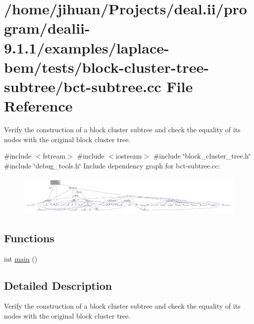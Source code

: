 \hypertarget{bct-subtree_8cc}{}\section{/home/jihuan/\+Projects/deal.ii/program/dealii-\/9.1.1/examples/laplace-\/bem/tests/block-\/cluster-\/tree-\/subtree/bct-\/subtree.cc File Reference}
\label{bct-subtree_8cc}


Verify the construction of a block cluster subtree and check the equality of its nodes with the original block cluster tree.  


{\ttfamily \#include $<$fstream$>$}\newline
{\ttfamily \#include $<$iostream$>$}\newline
{\ttfamily \#include \char`\"{}block\+\_\+cluster\+\_\+tree.\+h\char`\"{}}\newline
{\ttfamily \#include \char`\"{}debug\+\_\+tools.\+h\char`\"{}}\newline
Include dependency graph for bct-\/subtree.cc\+:
\nopagebreak
\begin{figure}[H]
\begin{center}
\leavevmode
\includegraphics[width=350pt]{bct-subtree_8cc__incl}
\end{center}
\end{figure}
\subsection*{Functions}
\begin{DoxyCompactItemize}
\item 
int \hyperlink{bct-subtree_8cc_ae66f6b31b5ad750f1fe042a706a4e3d4}{main} ()
\end{DoxyCompactItemize}


\subsection{Detailed Description}
Verify the construction of a block cluster subtree and check the equality of its nodes with the original block cluster tree. 

